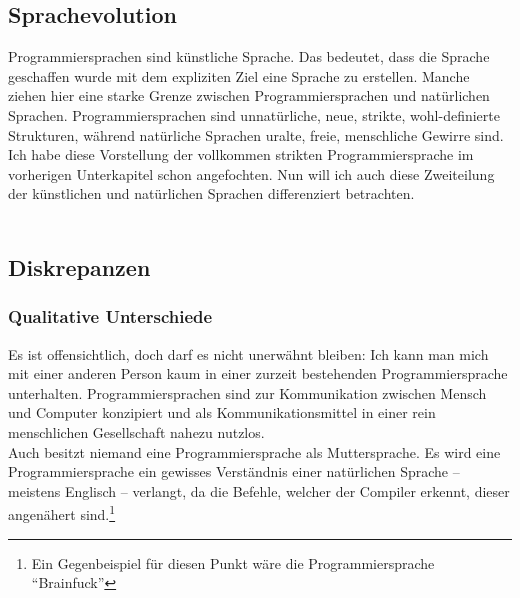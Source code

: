 \documentclass[a4paper,10pt]{article}
\begin{document}
\subsection{Sprachevolution}
Programmiersprachen sind künstliche Sprache. Das bedeutet, dass die Sprache geschaffen wurde mit dem expliziten Ziel eine Sprache zu erstellen. Manche ziehen hier eine starke Grenze zwischen Programmiersprachen und natürlichen Sprachen. Programmiersprachen sind unnatürliche, neue, strikte, wohl-definierte Strukturen, während natürliche Sprachen uralte, freie, menschliche Gewirre sind.
Ich habe diese Vorstellung der vollkommen strikten Programmiersprache im vorherigen Unterkapitel schon angefochten. Nun will ich auch diese Zweiteilung der künstlichen und natürlichen Sprachen differenziert betrachten. \\
\\



\subsection{Diskrepanzen}
\subsubsection{Qualitative Unterschiede}
Es ist offensichtlich, doch darf es nicht unerwähnt bleiben: Ich kann man mich mit einer anderen Person kaum in einer zurzeit bestehenden Programmiersprache unterhalten. Programmiersprachen sind zur Kommunikation zwischen Mensch und Computer konzipiert und als Kommunikationsmittel in einer rein menschlichen Gesellschaft nahezu nutzlos. \\
Auch besitzt niemand eine Programmiersprache als Muttersprache. Es wird eine Programmiersprache ein gewisses Verständnis einer natürlichen Sprache -- meistens Englisch --  verlangt, da die Befehle, welcher der Compiler erkennt, dieser angenähert sind.\footnote{Ein Gegenbeispiel für diesen Punkt wäre die Programmiersprache \enquote{Brainfuck}} \\
\end{document}
